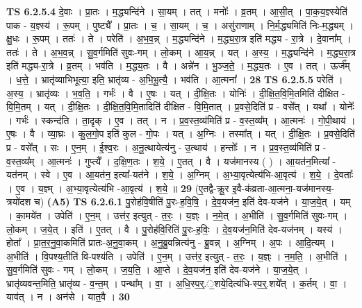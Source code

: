\documentclass[17pt]{extarticle}
\begin{document}
                  \newline
                                \textbf{ TS 6.2.5.4} \newline
                  दे॒वाः । प्रा॒तः । म॒द्ध्यन्दि॑ने । सा॒यम् । तत् । मनोः᳚ । व्र॒तम् । आ॒सी॒त् । पा॒क॒य॒ज्ञ्स्येति॑ पाक - य॒ज्ञ्स्य॑ । रू॒पम् । पुष्ट्यै᳚ । प्रा॒तः । च॒ । सा॒यम् । च॒ । असु॑राणाम् । नि॒र्म॒द्ध्यमिति॑ निः-म॒द्ध्यम् । क्षु॒धः । रू॒पम् । ततः॑ । ते । परेति॑ । अ॒भ॒व॒न्न् । म॒द्ध्यन्दि॑ने । म॒द्ध्य॒रा॒त्र इति॑ मद्ध्य - रा॒त्रे । दे॒वाना᳚म् । ततः॑ । ते । अ॒भ॒व॒न्न् । सु॒व॒र्गमिति॑ सुवः-गम् । लो॒कम् । आ॒य॒न्न् । यत् । अ॒स्य॒ । म॒द्ध्यन्दि॑ने । म॒द्ध्य॒रा॒त्र इति॑ मद्ध्य-रा॒त्रे । व्र॒तम् । भव॑ति । म॒द्ध्य॒तः । वै । अन्ने॑न । भु॒ञ्ज॒ते॒ । म॒द्ध्य॒तः । ए॒व । तत् । ऊर्ज᳚म् । ध॒त्ते॒ । भ्रातृ॑व्याभिभूत्या॒ इति॒ भ्रातृ॑व्य - अ॒भि॒भू॒त्यै॒ । भव॑ति । आ॒त्मना᳚ । \textbf{  28} \newline
                  \newline
                                \textbf{ TS 6.2.5.5} \newline
                  परेति॑ । अ॒स्य॒ । भ्रातृ॑व्यः । भ॒व॒ति॒ । गर्भः॑ । वै । ए॒षः । यत् । दी॒क्षि॒तः । योनिः॑ । दी॒क्षि॒त॒वि॒मि॒तमिति॑ दीक्षित - वि॒मि॒तम् । यत् । दी॒क्षि॒तः । दी॒क्षि॒त॒वि॒मि॒तादिति॑ दीक्षित - वि॒मि॒तात् । प्र॒वसे॒दिति॑ प्र - वसे᳚त् । यथा᳚ । योनेः᳚ । गर्भः॑ । स्कन्द॑ति । ता॒दृक् । ए॒व । तत् । न । प्र॒व॒स्त॒व्य॑मिति॑ प्र - व॒स्त॒व्य᳚म् । आ॒त्मनः॑ । गो॒पी॒थाय॑ । ए॒षः । वै । व्या॒घ्रः । कु॒ल॒गो॒प इति॑ कुल - गो॒पः । यत् । अ॒ग्निः । तस्मा᳚त् । यत् । दी॒क्षि॒तः । प्र॒वसे॒दिति॑ प्र - वसे᳚त् । सः । ए॒न॒म् । ई॒श्व॒रः । अ॒नू॒त्थायेत्य॑नु - उ॒त्थाय॑ । हन्तोः᳚ । न । प्र॒व॒स्त॒व्य॑मिति॑ प्र - व॒स्त॒व्य᳚म् । आ॒त्मनः॑ । गुप्त्यै᳚ । द॒क्षि॒ण॒तः । श॒ये॒ । ए॒तत् । वै । यज॑मानस्य ( ) । आ॒यत॑न॒मित्या᳚ - यत॑नम् । स्वे । ए॒व । आ॒यत॑न॒ इत्या᳚-यत॑ने । श॒ये॒ । अ॒ग्निम् । अ॒भ्या॒वृत्येत्य॑भि-आ॒वृत्य॑ । श॒ये॒ । दे॒वताः᳚ । ए॒व । य॒ज्ञ्म् । अ॒भ्या॒वृत्येत्य॑भि -आ॒वृत्य॑ । श॒ये॒ ॥ \textbf{  29 } \newline
                  \newline
                      (ए॒तद्वै-क्रू॒र इ॒वै-क॑व्रता-आ॒त्मना॒-यज॑मानस्य॒-त्रयो॑दश च)  \textbf{(A5)} \newline \newline
                                \textbf{ TS 6.2.6.1} \newline
                  पु॒रोह॑वि॒षीति॑ पु॒रः-ह॒वि॒षि॒ । दे॒व॒यज॑न॒ इति॑ देव-यज॑ने । या॒ज॒ये॒त् । यम् । का॒मये॑त । उपेति॑ । ए॒न॒म् । उत्त॑र॒ इत्युत् - त॒रः॒ । य॒ज्ञ्ः । न॒मे॒त् । अ॒भीति॑ । सु॒व॒र्गमिति॑ सुवः-गम् । लो॒कम् । ज॒ये॒त् । इति॑ । ए॒तत् । वै । पु॒रोह॑वि॒रिति॑ पु॒रः-ह॒विः॒ । दे॒व॒यज॑न॒मिति॑ देव-यज॑नम् । यस्य॑ । होता᳚ । प्रा॒त॒र॒नु॒वा॒कमिति॑ प्रातः-अ॒नु॒वा॒कम् । अ॒नु॒ब्रु॒वन्नित्य॑नु - ब्रु॒वन्न् । अ॒ग्निम् । अ॒पः । आ॒दि॒त्यम् । अ॒भीति॑ । वि॒पश्य॒तीति॑ वि-पश्य॑ति । उपेति॑ । ए॒न॒म् । उत्त॑र॒ इत्युत् - त॒रः॒ । य॒ज्ञ्ः । न॒म॒ति॒ । अ॒भीति॑ । सु॒व॒र्गमिति॑ सुवः - गम् । लो॒कम् । ज॒य॒ति॒ । आ॒प्ते । दे॒व॒यज॑न॒ इति॑ देव-यज॑ने । या॒ज॒ये॒त् । भ्रातृ॑व्यवन्त॒मिति॒ भ्रातृ॑व्य - व॒न्त॒म् । पन्था᳚म् । वा॒ । अ॒धि॒स्प॒र्॒.॒शये॒दित्य॑धि-स्प॒र्॒.शये᳚त् । क॒र्तम् । वा॒ । याव॑त् । न । अन॑से । यात॒वै । \textbf{  30} \newline
\end{document}
